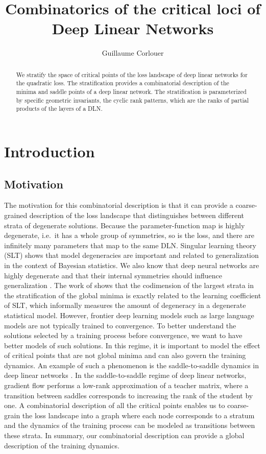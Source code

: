 \documentclass[11pt]{article}
\title{Combinatorics of the critical loci of Deep Linear Networks}
\author{Guillaume Corlouer}
\date{}
\theoremstyle{definition}
\begin{document}
\maketitle

\begin{abstract}
We stratify the space of critical points of the loss landscape of deep linear networks for the quadratic loss. The stratification provides a combinatorial description of the minima and saddle points of a deep linear network. The stratification is parameterized by specific geometric invariants, the cyclic rank patterns, which are the ranks of partial products of the layers of a DLN.
\end{abstract}

\tableofcontents

\section{Introduction}
\subsection{Motivation}
The motivation for this combinatorial description is that it can provide a coarse-grained description of the loss landscape that distinguishes between different strata of degenerate solutions. Because the parameter-function map is highly degenerate, i.e.\ it has a whole group of symmetries, so is the loss, and there are infinitely many parameters that map to the same DLN. Singular learning theory (SLT) \cite{watanabe2009algebraic} shows that model degeneracies are important and related to generalization in the context of Bayesian statistics. We also know that deep neural networks are highly degenerate and that their internal symmetries should influence generalization \cite{wei2022deep}. The work of \cite{lehalleur2024geometry} shows that the codimension of the largest strata in the stratification of the global minima is exactly related to the learning coefficient of SLT, which informally measures the amount of degeneracy in a degenerate statistical model. However, frontier deep learning models such as large language models are not typically trained to convergence. To better understand the solutions selected by a training process before convergence, we want to have better models of such solutions. In this regime, it is important to model the effect of critical points that are not global minima and can also govern the training dynamics. An example of such a phenomenon is the saddle-to-saddle dynamics in deep linear networks \cite{jacot2018neural,saxe2019mathematical}. In the saddle-to-saddle regime of deep linear networks, gradient flow performs a low-rank approximation of a teacher matrix, where a transition between saddles corresponds to increasing the rank of the student by one. A combinatorial description of all the critical points enables us to coarse-grain the loss landscape into a graph where each node corresponds to a stratum and the dynamics of the training process can be modeled as transitions between these strata. In summary, our combinatorial description can provide a global description of the training dynamics.
\end{document}
